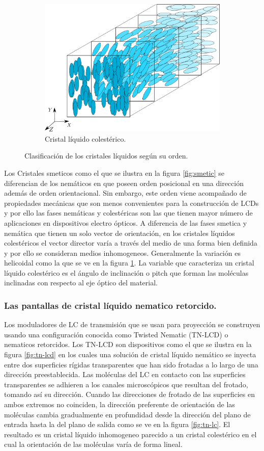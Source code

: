 \begin{figure}[h!]
\begin{subfigure}{.5\textwidth}
  \centering
  \includegraphics[width=.6\linewidth]{Cholesteric_LC_2}
  \caption{Cristal líquido colestérico.}
  \label{fig:cholesteric}
\end{subfigure}
\caption{Clasificación de los cristales líquidos según su orden.}
\label{fig:CL_clasificacion}
\end{figure}

Los Cristales smeticos como el que se ilustra en la figura
\ref{fig:smetic} se diferencian de los nemáticos en que poseen orden
posicional en una dirección además de orden orientacional. Sin embargo,
este orden viene acompañado de propiedades mecánicas que son menos
convenientes para la construcción de LCDs y por ello las fases
nemáticas y colestéricas son las que tienen mayor número de
aplicaciones en dispositivos electro ópticos. 
A diferencia de las fases smetica y nemática que tienen un solo vector
de orientación, en los cristales líquidos colestéricos el vector
director varía a través del medio de una forma bien
definida y por ello se consideran medios inhomogeneos. Generalmente la
variación es helicoidal como la que se ve en la figura \ref{fig:cholesteric}.   
La variable que caracteriza un cristal líquido colestérico es el
ángulo de inclinación o pitch que forman las moléculas inclinadas con
respecto al eje óptico del material. 


\subsubsection{Las pantallas de cristal líquido nematico retorcido.}


Los moduladores de LC de transmisión que se usan para proyección se
construyen usando una configuración conocida como Twisted
Nematic (TN-LCD) o nematicos retorcidos. Los TN-LCD son
dispositivos como el que se ilustra en la figura \ref{fig:tn-lcd} en
los cuales una  solución de cristal líquido nemático 
se inyecta entre dos superficies rígidas transparentes que han sido frotadas
a lo largo de una dirección preestablecida. Las moléculas del LC en contacto con las
superficies transparentes se adhieren a los canales microscópicos que
resultan del frotado, tomando así su dirección. Cuando las direcciones
de frotado de las superficies en ambos extremos no coinciden, la
dirección preferente de orientación de las moléculas cambia
gradualmente en profundidad desde la dirección del plano de entrada hasta la del
plano de salida como se ve en la figura
\ref{fig:tn-lc}.  El resultado es un cristal líquido inhomogeneo
parecido a un cristal colestérico en el cual la orientación de las
moléculas varía de forma lineal.

